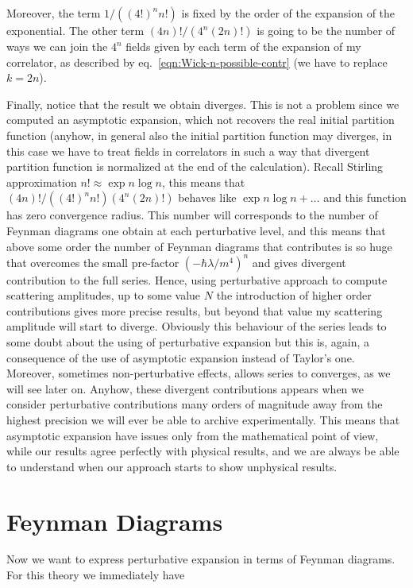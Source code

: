 \documentclass[../main/main.tex]{subfiles}
\begin{document}
Moreover, the term $1/((4!)^nn!)$ is fixed by the order of the expansion of the exponential. The other term $(4n)!/(4^n(2n)!)$ is going to be the number of ways we can join the $4^n$ fields given by each term of the expansion of my correlator, as described by eq.~\eqref{eqn:Wick-n-possible-contr} (we have to replace $k=2n$). 

Finally, notice that the result we obtain diverges. This is not a problem since we computed an asymptotic expansion, which not recovers the real initial partition function (anyhow, in general also the initial partition function may diverges, in this case we have to treat fields in correlators in such a way that divergent partition function is normalized at the end of the calculation). Recall Stirling approximation $n!\approx\exp{n\log n}$, this means that $(4n)!/((4!)^nn!)(4^n(2n)!)$ behaves like $\exp{n\log n+\dots}$ and this function has zero convergence radius. This number will corresponds to the number of Feynman diagrams one obtain at each perturbative level, and this means that above some order the number of Feynman diagrams that contributes is so huge that overcomes the small pre-factor $(-\hbar\lambda/m^4)^n$ and gives divergent contribution to the full series. Hence,  using perturbative approach to compute scattering amplitudes, up to some value $N$ the introduction of higher order contributions gives more precise results, but beyond that value my scattering amplitude will start to diverge. Obviously this behaviour of the series leads to some doubt about the using of perturbative expansion but this is, again, a consequence of the use of asymptotic expansion instead of Taylor's one. Moreover, sometimes non-perturbative effects, allows series to converges, as we will see later on. Anyhow,  these divergent contributions appears when we consider perturbative contributions many orders of magnitude away from the highest precision we will ever be able to archive experimentally. This means that asymptotic expansion have issues only from the mathematical point of view, while our results agree perfectly with physical results, and we are always be able to understand when our approach starts to show unphysical results. 


\section{Feynman Diagrams}

Now we want to express perturbative expansion in terms of Feynman diagrams. For this theory we immediately have
\end{document}
